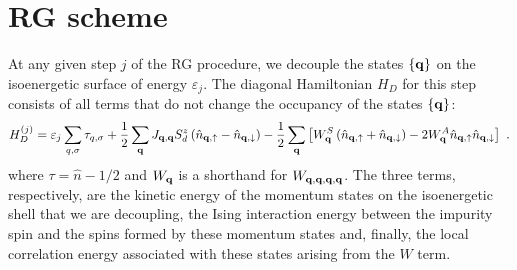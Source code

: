 \documentclass{revtex4-2}
\begin{document}
\section{RG scheme}
At any given step \(j\) of the RG procedure, we decouple the states \(\left\{ {\bf q} \right\} \) on the isoenergetic surface of energy \(\varepsilon_j\). The diagonal Hamiltonian \(H_D\) for this step consists of all terms that do not change the occupancy of the states \(\left\{{\bf q}\right\}\):
\begin{equation}\begin{aligned}
	H_D^{(j)} = \varepsilon_j\sum_{q,\sigma}\tau_{q,\sigma} + \frac{1}{2}\sum_{{\bf q}}J_{{\bf q}, {\bf q}}S_d^z\left(\hat n_{{\bf q}, \uparrow} - \hat n_{{\bf q}, \downarrow}\right) - \frac{1}{2}\sum_{{\bf q}}\left[W^S_{{\bf q}}\left(\hat n_{{\bf q}, \uparrow} + \hat n_{{\bf q}, \downarrow}\right) - 2W^A_{{\bf q}}\hat n_{{\bf q}, \uparrow}\hat n_{{\bf q}, \downarrow}\right]~.
\end{aligned}\end{equation}
where \(\tau = \hat n - 1/2\) and \(W_{{\bf q}}\) is a shorthand for \(W_{{\bf q},{\bf q},{\bf q},{\bf q}}\). The three terms, respectively, are the kinetic energy of the momentum states on the isoenergetic shell that we are decoupling, the Ising interaction energy between the impurity spin and the spins formed by these momentum states and, finally, the local correlation energy associated with these states arising from the \(W\) term.
\end{document}
